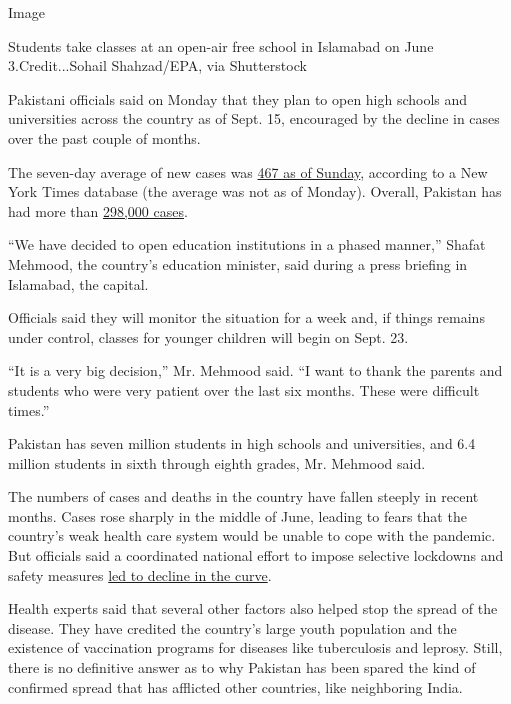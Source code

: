 Image

Students take classes at an open-air free school in Islamabad on June
3.Credit...Sohail Shahzad/EPA, via Shutterstock

Pakistani officials said on Monday that they plan to open high schools
and universities across the country as of Sept. 15, encouraged by the
decline in cases over the past couple of months.

The seven-day average of new cases was
\href{https://www.nytimes3xbfgragh.onion/interactive/2020/world/coronavirus-maps.html}{467
as of Sunday}, according to a New York Times database (the average was
not as of Monday). Overall, Pakistan has had more than
\href{https://www.nytimes3xbfgragh.onion/interactive/2020/world/coronavirus-maps.html\#countries}{298,000
cases}.

``We have decided to open education institutions in a phased manner,''
Shafat Mehmood, the country's education minister, said during a press
briefing in Islamabad, the capital.

Officials said they will monitor the situation for a week and, if things
remains under control, classes for younger children will begin on Sept.
23.

``It is a very big decision,'' Mr. Mehmood said. ``I want to thank the
parents and students who were very patient over the last six months.
These were difficult times.''

Pakistan has seven million students in high schools and universities,
and 6.4 million students in sixth through eighth grades, Mr. Mehmood
said.

The numbers of cases and deaths in the country have fallen steeply in
recent months. Cases rose sharply in the middle of June, leading to
fears that the country's weak health care system would be unable to cope
with the pandemic. But officials said a coordinated national effort to
impose selective lockdowns and safety measures
\href{https://www.nytimes3xbfgragh.onion/2020/06/10/world/asia/reopening-before-coronavirus-ends.html?searchResultPosition=20}{led
to decline in the curve}.

Health experts said that several other factors also helped stop the
spread of the disease. They have credited the country's large youth
population and the existence of vaccination programs for diseases like
tuberculosis and leprosy. Still, there is no definitive answer as to why
Pakistan has been spared the kind of confirmed spread that has afflicted
other countries, like neighboring India.

